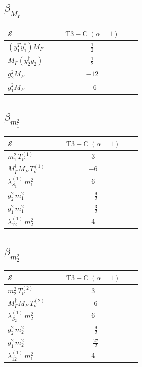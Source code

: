 \documentclass[9pt]{article}
\begin{document}
\subsection*{$ \beta_{M_F} $}
\begin{longtable}{@{}p{0.31\linewidth}c@{}}
\toprule
$\mathcal{S}$ & $ \mathrm{T3-C}\;(\alpha=1) $ \\
\midrule
$ (y_1^T y_1^*)M_F $ & $ \frac{1}{2} $ \\
$ M_F(y_2^\dagger y_2) $ & $ \frac{1}{2} $ \\
$ g_2^2M_F $ & $ -12 $ \\
$ g_1^2M_F $ & $ -6 $ \\
\bottomrule
\end{longtable}
\subsection*{$ \beta_{m_1^{2}} $}
\begin{longtable}{@{}p{0.31\linewidth}c@{}}
\toprule
$\mathcal{S}$ & $ \mathrm{T3-C}\;(\alpha=1) $ \\
\midrule
$ m_1^{2}\,T_{\nu}^{(1)} $ & $ 3 $ \\
$ M_F^\dagger M_F\,T_{\nu}^{(1)} $ & $ -6 $ \\
$ \lambda_{S_1}^{(1)}\,m_1^{2} $ & $ 6 $ \\
$ g_2^2\,m_1^{2} $ & $ - \frac{9}{2} $ \\
$ g_1^2\,m_1^{2} $ & $ - \frac{3}{2} $ \\
$ \lambda_{12}^{(1)}\,m_2^{2} $ & $ 4 $ \\
\bottomrule
\end{longtable}
\subsection*{$ \beta_{m_2^{2}} $}
\begin{longtable}{@{}p{0.31\linewidth}c@{}}
\toprule
$\mathcal{S}$ & $ \mathrm{T3-C}\;(\alpha=1) $ \\
\midrule
$ m_2^{2}\,T_{\nu}^{(2)} $ & $ 3 $ \\
$ M_F^\dagger M_F\,T_{\nu}^{(2)} $ & $ -6 $ \\
$ \lambda_{S_2}^{(1)}\,m_2^{2} $ & $ 6 $ \\
$ g_2^2\,m_2^{2} $ & $ - \frac{9}{2} $ \\
$ g_1^2\,m_2^{2} $ & $ - \frac{27}{2} $ \\
$ \lambda_{12}^{(1)}\,m_1^{2} $ & $ 4 $ \\
\bottomrule
\end{longtable}
\end{document}
